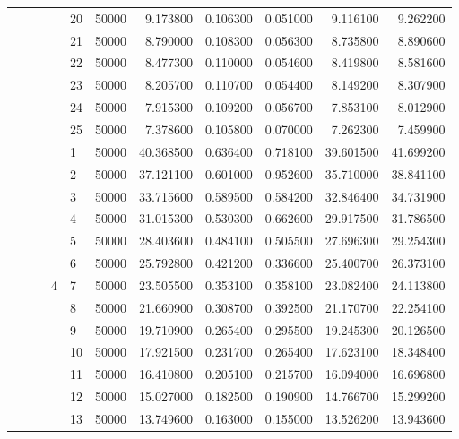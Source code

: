 \begin{tabular}{llllllrrrrr}
\cline{5-11}
 &  &  &  & 20 & 50000 & 9.173800 & 0.106300 & 0.051000 & 9.116100 & 9.262200 \\
\cline{5-11}
 &  &  &  & 21 & 50000 & 8.790000 & 0.108300 & 0.056300 & 8.735800 & 8.890600 \\
\cline{5-11}
 &  &  &  & 22 & 50000 & 8.477300 & 0.110000 & 0.054600 & 8.419800 & 8.581600 \\
\cline{5-11}
 &  &  &  & 23 & 50000 & 8.205700 & 0.110700 & 0.054400 & 8.149200 & 8.307900 \\
\cline{5-11}
 &  &  &  & 24 & 50000 & 7.915300 & 0.109200 & 0.056700 & 7.853100 & 8.012900 \\
\cline{5-11}
 &  &  &  & 25 & 50000 & 7.378600 & 0.105800 & 0.070000 & 7.262300 & 7.459900 \\
\cline{4-11} \cline{5-11}
 &  &  & \multirow[t]{25}{*}{4} & 1 & 50000 & 40.368500 & 0.636400 & 0.718100 & 39.601500 & 41.699200 \\
\cline{5-11}
 &  &  &  & 2 & 50000 & 37.121100 & 0.601000 & 0.952600 & 35.710000 & 38.841100 \\
\cline{5-11}
 &  &  &  & 3 & 50000 & 33.715600 & 0.589500 & 0.584200 & 32.846400 & 34.731900 \\
\cline{5-11}
 &  &  &  & 4 & 50000 & 31.015300 & 0.530300 & 0.662600 & 29.917500 & 31.786500 \\
\cline{5-11}
 &  &  &  & 5 & 50000 & 28.403600 & 0.484100 & 0.505500 & 27.696300 & 29.254300 \\
\cline{5-11}
 &  &  &  & 6 & 50000 & 25.792800 & 0.421200 & 0.336600 & 25.400700 & 26.373100 \\
\cline{5-11}
 &  &  &  & 7 & 50000 & 23.505500 & 0.353100 & 0.358100 & 23.082400 & 24.113800 \\
\cline{5-11}
 &  &  &  & 8 & 50000 & 21.660900 & 0.308700 & 0.392500 & 21.170700 & 22.254100 \\
\cline{5-11}
 &  &  &  & 9 & 50000 & 19.710900 & 0.265400 & 0.295500 & 19.245300 & 20.126500 \\
\cline{5-11}
 &  &  &  & 10 & 50000 & 17.921500 & 0.231700 & 0.265400 & 17.623100 & 18.348400 \\
\cline{5-11}
 &  &  &  & 11 & 50000 & 16.410800 & 0.205100 & 0.215700 & 16.094000 & 16.696800 \\
\cline{5-11}
 &  &  &  & 12 & 50000 & 15.027000 & 0.182500 & 0.190900 & 14.766700 & 15.299200 \\
\cline{5-11}
 &  &  &  & 13 & 50000 & 13.749600 & 0.163000 & 0.155000 & 13.526200 & 13.943600 \\

\end{tabular}
